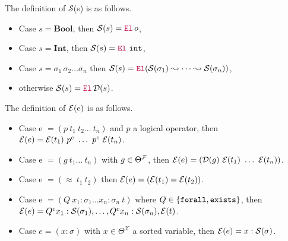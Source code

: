 \begin{definition} 
  The definition of $\mathcal{S}$(s) is as follows.
  \begin{itemize}
    \item Case $s = \textbf{Bool}$, then $\Sort{s} = \el\,o$,
    \item Case $s = \textbf{Int}$, then $\Sort{s} = \el~\texttt{int}$,
    \item Case $s = \sigma_1\,\sigma_2 \dots \sigma_n$ then $\Sort{s} = \el{} (\mathcal{S}(\sigma_1) \leadsto \dots \leadsto \mathcal{S}(\sigma_n))$,
    \item otherwise $\Sort{s} = \el\, \mathcal{D}(s)$.
  \end{itemize}
\end{definition}


\begin{definition}
The definition of $\E{e}$ is as follows.
\begin{itemize}
\setlength{\parskip}{0pt}
\item Case e $= (p~t_1~t_2\dots~t_n)$ and $p$ a logical operator, then $\E{e} = \E{t_1}~p^c~\dots~p^c~\E{t_n}$.
\item Case e $= (g~t_1\dots~t_n)$ with $g \in \Theta^\cal{F}$, then $\E{e} = (\mathcal{D}(g)~\E{t_1}~\dots~\E{t_n})$.
\item Case e $= (\approx~t_1~t_2)$ then $\E{e} = (\E{t_1} = \E{t_2})$.
\item Case e $= (Q~x_1 : \sigma_1  \dots x_n : \sigma_n ~t)$ where $Q\in \{\kw{forall}, \kw{exists}\}$, then $\E{e} = Q^c x_1: \cal{S}(\sigma_1), \dots, Q^c x_n: \cal{S}(\sigma_n), \E{t}$. 
\item Case $e = (x: \sigma )$ with $x \in \Theta^\mathcal{X}$ a sorted variable, then $\E{e} = x: \cal{S}(\sigma)$.
\end{itemize}
\end{definition}